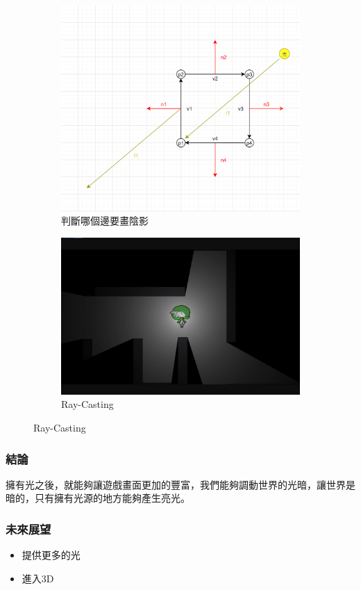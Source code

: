 \begin{figure}[h]
    \begin{subfigure}[b]{0.5\linewidth}
        \includegraphics[width=\linewidth]{./resources/2D-Lighting/DrawShadow3.png} 
        \caption{判斷哪個邊要畫陰影}
    \end{subfigure}
    \begin{subfigure}[b]{0.5\linewidth}
        \includegraphics[width=\linewidth]{./resources/2D-Lighting/Ray-Cast.png} 
        \caption{Ray-Casting}
    \end{subfigure}
\label{fig:RayCasting}
\end{figure}

\subsubsection{結論}

擁有光之後，就能夠讓遊戲畫面更加的豐富，我們能夠調動世界的光暗，讓世界是暗的，只有擁有光源的地方能夠產生亮光。

\subsubsection{未來展望}

\begin{itemize}
\item{提供更多的光}
\item{進入3D}
\end{itemize}

\newpage
